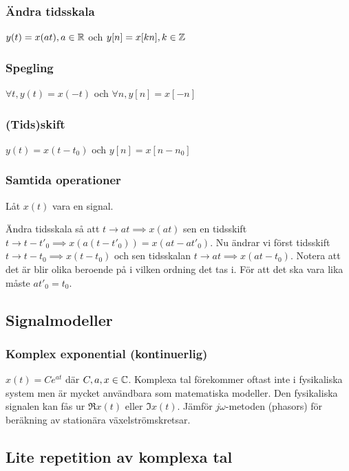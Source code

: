 \documentclass[a4paper]{article}
\begin{document}
\subsubsection{Ändra tidsskala}
\(
    y(t) = x(at), a \in \mathbb{R}
\) och \(
    y[n] = x[kn], k \in \mathbb{Z}
\) 

\subsubsection{Spegling}
\(
    \forall t, y(t) = x(-t)
\) och \(
    \forall n, y[n] = x[-n]
\) 

\subsubsection{(Tids)skift}
\(
    y(t) = x(t-t_0)
\) och \(
    y[n] = x[n-n_0]
\) 

\subsubsection{Samtida operationer}
Låt \(
    x(t)
\) vara en signal.

Ändra tidsskala så att \(
    t \to at \implies x(at)
\) sen en tidsskift \(
    t \to t-t'_0 \implies x(a(t-t'_0)) = x(at-at'_0)
\). Nu ändrar vi först tidsskift \(
    t \to t-t_0 \implies x(t-t_0)
\) och sen tidsskalan \(
    t \to at \implies x(at-t_0)
\). Notera att det är blir olika beroende på i vilken ordning det tas i.
För att det ska vara lika måste \(
    at'_0 = t_0
\).

\subsection{Signalmodeller}
\subsubsection{Komplex exponential (kontinuerlig)}
\(
    x(t) = Ce^{at}
\) där \(
    C, a, x \in \mathbb{C}
\). Komplexa tal förekommer oftast inte i fysikaliska system men är mycket
användbara som matematiska modeller. Den fysikaliska signalen kan fås
ur \(
    \Re{x(t)} \text{ eller } \Im{x(t)}
\). Jämför \(
    j\omega
\)-metoden (phasors) för beräkning av stationära växelströmskretsar.

\subsection{Lite repetition av komplexa tal}
\end{document}
